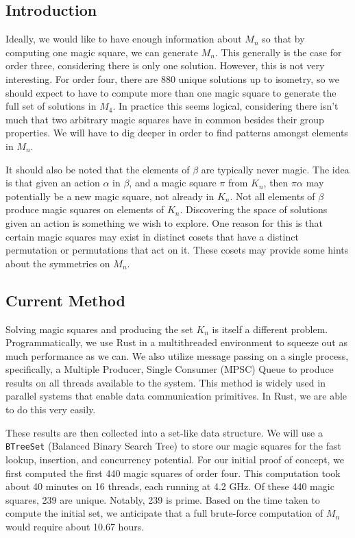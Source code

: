 \documentclass{rhumj_new}
\begin{document}
\subsection{Introduction}

Ideally, we would like to have enough information about $M_n$ so that by computing one magic
square, we can generate $M_n$. This generally is the case for order three, considering there is
only one solution. However, this is not very interesting. For order four, there are 880 unique
solutions up to isometry, so we should expect to have to compute more than one magic square to
generate the full set of solutions in $M_4$. In practice this seems logical, considering there
isn't much that two arbitrary magic squares have in common besides their group properties. We will
have to dig deeper in order to find patterns amongst elements in $M_n$.

It should also be noted that the elements of $\beta$ are typically never magic. The idea is
that given an action $\alpha$ in $\beta$, and a magic square $\pi$ from $K_n$, then $\pi\alpha$ may
potentially be a new magic square, not already in $K_n$. Not all elements of $\beta$ produce magic
squares on elements of $K_n$. Discovering the space of solutions given an action is something we
wish to explore. One reason for this is that certain magic squares may exist in distinct cosets
that have a distinct permutation or permutations that act on it. These cosets may provide some
hints about the symmetries on $M_n$.

\subsection{Current Method}

Solving magic squares and producing the set $K_n$ is itself a different problem.
Programmatically, we use Rust in a multithreaded environment to squeeze out as much performance as
we can. We also utilize message passing on a single process, specifically, a Multiple Producer,
Single Consumer (MPSC) Queue to produce results on all threads available to the system. This method
is widely used in parallel systems that enable data communication primitives. In Rust, we are able
to do this very easily.

These results are then collected into a set-like data structure. We will use a
\texttt{BTreeSet} (Balanced Binary Search Tree) to store our magic squares for the fast lookup,
insertion, and concurrency potential. For our initial proof of concept, we first computed the first
440 magic squares of order four. This computation took about 40 minutes on 16 threads, each running
at 4.2 GHz. Of these 440 magic squares, 239 are unique. Notably, 239 is prime. Based on the time
taken to compute the initial set, we anticipate that a full brute-force computation of $M_n$ would
require about 10.67 hours.
\end{document}

